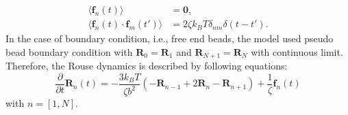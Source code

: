 \documentclass[10pt, a4paper]{article}
\begin{document}
\begin{align}
\langle \mathbf{f}_n(t)\rangle &= \mathbf{0},\\
\langle \mathbf{f}_n(t)\cdot\mathbf{f}_m(t')\rangle &= 2\zeta k_BT\delta_{nm}\delta(t-t').
\end{align}
In the case of boundary condition, i.e., free end beads, the model used pseudo bead boundary condition with $\mathbf{R}_0 = \mathbf{R}_1$ and $\mathbf{R}_{N+1} = \mathbf{R}_N$ with continuous limit.
Therefore, the Rouse dynamics is described by following equations:
\begin{equation}
\frac{\partial}{\partial t} \mathbf{R}_n(t) = -\frac{3k_BT}{\zeta b^2}\left(-\mathbf{R}_{n-1} + 2\mathbf{R}_n - \mathbf{R}_{n+1}\right) + \frac{1}{\zeta}\mathbf{f}_n(t)
\label{eq:Langevin_discrete_Rouse}
\end{equation}
with $n = [1, N]$.
\end{document}
